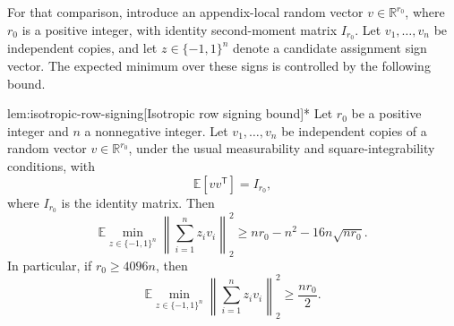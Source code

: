 \documentclass[11pt]{article}
\begin{document}
For that comparison, introduce an appendix-local random vector \(v\in\mathbb R^{r_0}\), where \(r_0\) is a positive integer, with identity second-moment matrix \(I_{r_0}\). Let \(v_1,\ldots,v_n\) be independent copies, and let \(z\in\{-1,1\}^n\) denote a candidate assignment sign vector. The expected minimum over these signs is controlled by the following bound.

\begin{lemmav}{lem:isotropic-row-signing}[Isotropic row signing bound]*
Let \(r_0\) be a positive integer and \(n\) a nonnegative integer. Let \(v_1,\ldots,v_n\) be independent copies of a random vector \(v\in\mathbb R^{r_0}\), under the usual measurability and square-integrability conditions, with
\[
\mathbb E[vv^{\mathsf T}]=I_{r_0},
\]
where \(I_{r_0}\) is the identity matrix. Then
\[
\mathbb E\min_{z\in\{-1,1\}^n}
\left\|\sum_{i=1}^n z_i v_i\right\|_2^2
\geq nr_0-n^2-16n\sqrt{nr_0}.
\]
In particular, if \(r_0\geq4096n\), then
\[
\mathbb E\min_{z\in\{-1,1\}^n}
\left\|\sum_{i=1}^n z_i v_i\right\|_2^2
\geq \frac{nr_0}{2}.
\]
\end{lemmav}
\end{document}
